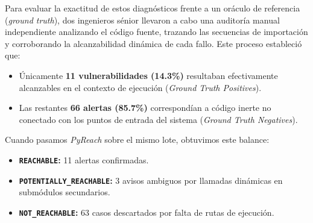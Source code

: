 \documentclass[conference]{IEEEtran}
\begin{document}
Para evaluar la exactitud de estos diagnósticos frente a un oráculo de referencia (\textit{ground truth}), dos ingenieros sénior llevaron a cabo una auditoría manual independiente analizando el código fuente, trazando las secuencias de importación y corroborando la alcanzabilidad dinámica de cada fallo.  Este proceso estableció que:
\begin{itemize}
    \item Únicamente \textbf{11 vulnerabilidades (14.3\%)} resultaban efectivamente alcanzables en el contexto de ejecución (\textit{Ground Truth Positives}).
    \item Las restantes \textbf{66 alertas (85.7\%)} correspondían a código inerte no conectado con los puntos de entrada del sistema (\textit{Ground Truth Negatives}).
\end{itemize}

Cuando pasamos \textit{PyReach} sobre el mismo lote, obtuvimos este balance:
\begin{itemize}
    \item \textbf{\texttt{REACHABLE}:} 11 alertas confirmadas.
    \item \textbf{\texttt{POTENTIALLY\_REACHABLE}:} 3 avisos ambiguos por llamadas dinámicas en submódulos secundarios.
    \item \textbf{\texttt{NOT\_REACHABLE}:} 63 casos descartados por falta de rutas de ejecución.
\end{itemize}
\end{document}
